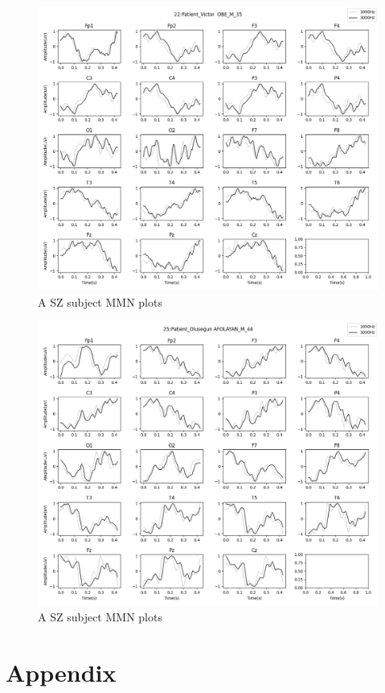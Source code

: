 \documentclass[10pt]{article}
\begin{document}
\begin{figure}[H]
  \includegraphics[width=16cm]{../../../data_analysis_results/MMN/time_series/Patient/22.png}
  \caption{A SZ subject MMN plots}
\end{figure}
\begin{figure}[H]
  \includegraphics[width=16cm]{../../../data_analysis_results/MMN/time_series/Patient/25.png}
  \caption{A SZ subject MMN plots}
\end{figure}

\clearpage
\section{Appendix}\label{sec:appendix}
\end{document}
